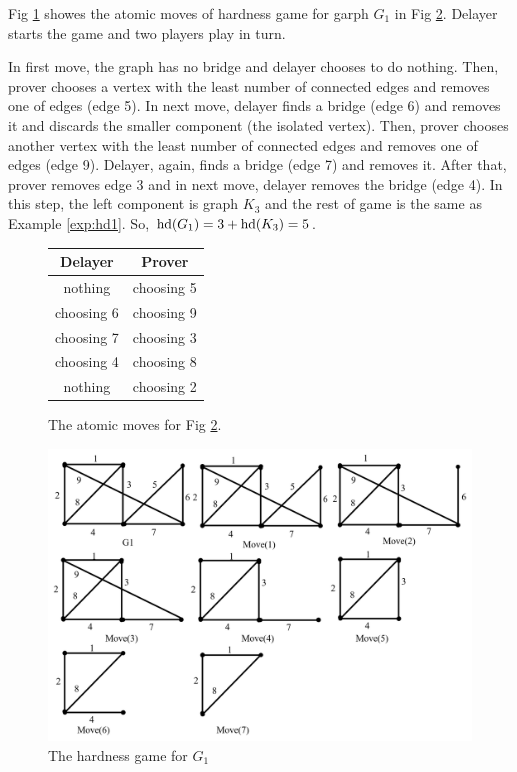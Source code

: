 \documentclass[]{book}
\begin{document}
\begin{examp}\label{exp:hd4}
       Fig \ref{fig:game4} showes the atomic moves of hardness game for garph $G_1$ in Fig \ref{fig:hd4}. Delayer starts the game and two 
	   players play in turn. 
	   
	   In first move, the graph has no bridge and delayer chooses to do nothing. Then, prover chooses a vertex with the least number of 
	   connected edges and removes one of edges (edge 5). In next move, delayer finds a bridge (edge 6) and removes it and discards the 
	   smaller component (the isolated vertex). Then, prover chooses another vertex with the least number of connected edges and removes 
	   one of edges (edge 9). Delayer, again, finds a bridge (edge 7) and removes it. After that, prover removes edge 3 and in next move, 
	   delayer removes the bridge (edge 4). In this step, the left component is graph $K_3$ and the rest of game is the same as Example 
	   \ref{exp:hd1}. So, $\operatorname{hd}(G_1)=3+\operatorname{hd}(K_3)=5$.
	 
	   \begin{figure}[h]
       \centering
       \begin{tabular}{|c|c|} 
       \hline
                  Delayer & Prover \\ \hline
                  nothing & choosing 5  \\ \hline
				  choosing 6 & choosing 9  \\ \hline
				  choosing 7 & choosing 3  \\ \hline
				  choosing 4 & choosing 8  \\ \hline
				  nothing & choosing 2  \\ \hline

      \end{tabular}
      \caption{The atomic moves for Fig \ref{fig:hd4}.}
      \label{fig:game4}
      \end{figure}
	  \begin{figure}
      \begin{center}
      \includegraphics[scale =0.57]{graph_hd1.png}
      \caption{The hardness game for  $G_1$}
	  \label{fig:hd4}
      \end{center}
      \end{figure}
\end{examp}
\end{document}
